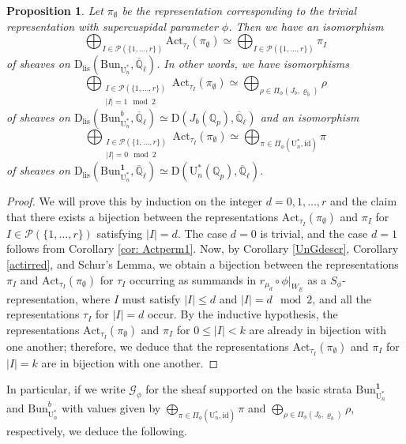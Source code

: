 \documentclass[reqno,11pt]{amsart}
\newtheorem{proposition}[theorem]{Proposition}
\theoremstyle{remark}
\newcommand{\U}{\mathrm{U}}
\newcommand{\id}{\mathrm{id}}
\newcommand{\mc}{\mathcal}
\newcommand{\Act}{\mathrm{Act}}
\newcommand{\Bun}{\mathrm{Bun}}
\newcommand{\Dc}{\mathrm{D}}
\newcommand{\Dlis}{\mathrm{D}_{\mathrm{lis}}}
\def\ol{\overline}
\begin{document}
\begin{proposition}{\label{unbijections}}
Let $\pi_{\emptyset}$ be the representation corresponding to the trivial representation with supercuspidal parameter $\phi$. Then we have an isomorphism 
\[ \bigoplus_{I \in \mc{P}(\{1,\ldots,r\})} \Act_{\tau_{I}}(\pi_{\emptyset}) \simeq \bigoplus_{I \in \mc{P}(\{1,\ldots,r\})} \pi_{I} \]
of sheaves on $\Dlis(\Bun_{\U^*_{n}},\ol{\mathbb{Q}}_{\ell})$. In other words, we have isomorphisms 
\[\bigoplus_{\substack{I \in \mc{P}(\{1,\ldots,r\}) \\ |I| = 1 \mod 2}} \Act_{\tau_{I}}(\pi_{\emptyset}) \simeq \bigoplus_{\rho \in \Pi_{\phi}(J_{b}, \varrho_b)} \rho  \]
of sheaves on $\Dlis(\Bun_{\U^*_n}^{b},\ol{\mathbb{Q}}_{\ell}) \simeq \Dc(J_{b}(\mathbb{Q}_{p}),\ol{\mathbb{Q}}_{\ell})$ and an isomorphism \[\bigoplus_{\substack{I \in \mc{P}(\{1,\ldots,r\}) \\ |I| = 0 \mod 2}} \Act_{\tau_{I}}(\pi_{\emptyset}) \simeq \bigoplus_{\pi \in \Pi_{\phi}(\U^*_n, \id)} \pi  \]
of sheaves on $\Dlis(\Bun_{\U^*_n}^{\mathbf{1}},\ol{\mathbb{Q}}_{\ell}) \simeq \Dc(\U^*_n(\mathbb{Q}_{p}),\ol{\mathbb{Q}}_{\ell})$. 
\end{proposition}
\begin{proof}
We will prove this by induction on the integer $d = 0,1,\ldots,r$ and the claim that there exists a bijection between the representations $\Act_{\tau_{I}}(\pi_{\emptyset})$ and $\pi_{I}$ for $I \in  \mc{P}(\{1,\ldots,r\})$ satisfying $|I| = d$. The case $d = 0$ is trivial, and the case $d = 1$ follows from Corollary \ref{cor: Actperm1}. Now, by Corollary \ref{UnGdescr}, Corollary \ref{actirred}, and Schur's Lemma, we obtain a bijection between the representations $\pi_{I}$ and $\Act_{\tau_{I}}(\pi_{\emptyset})$ for $\tau_{I}$ occurring as summands in $r_{\mu_{d}} \circ \phi|_{W_{E}}$ as a $S_{\phi}$-representation, where $I$ must satisfy $|I| \leq d$ and $|I| = d \mod 2$, and all the representations $\tau_{I}$ for $|I| = d$ occur. By the inductive hypothesis, the representations $\Act_{\tau_{I}}(\pi_{\emptyset})$ and $\pi_{I}$ for $0 \leq |I| < k$ are already in bijection with one another; therefore, we deduce that the representations $\Act_{\tau_{I}}(\pi_{\emptyset})$ and $\pi_{I}$ for $|I| = k$ are in bijection with one another.
\end{proof}
In particular, if we write $\mathcal{G}_{\phi}$ for the sheaf supported on the basic strata $\Bun_{\U^*_n}^{\mathbf{1}}$ and $\Bun_{\U^*_n}^{b}$ with values given by $\bigoplus_{\pi \in \Pi_{\phi}(\U^*_n, \id)} \pi$ and $\bigoplus_{\rho \in \Pi_{\phi}(J_{b}, \varrho_b)} \rho$, respectively, we deduce the following.
\end{document}
